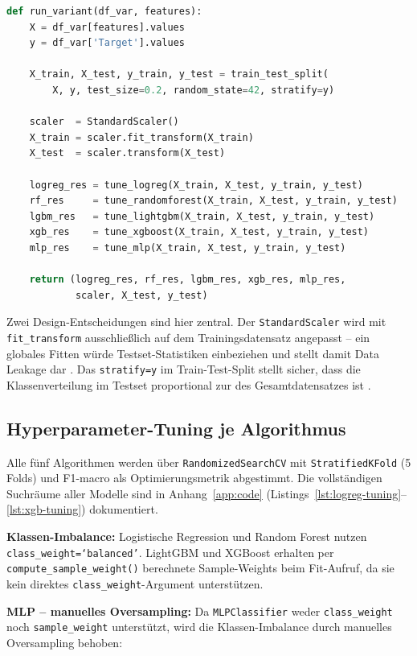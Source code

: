 \begin{lstlisting}[language=Python, caption={\texttt{run\_variant()}: gemeinsamer Trainings-Wrapper},
                   label={lst:run-variant}]
def run_variant(df_var, features):
    X = df_var[features].values
    y = df_var['Target'].values

    X_train, X_test, y_train, y_test = train_test_split(
        X, y, test_size=0.2, random_state=42, stratify=y)

    scaler  = StandardScaler()
    X_train = scaler.fit_transform(X_train)
    X_test  = scaler.transform(X_test)

    logreg_res = tune_logreg(X_train, X_test, y_train, y_test)
    rf_res     = tune_randomforest(X_train, X_test, y_train, y_test)
    lgbm_res   = tune_lightgbm(X_train, X_test, y_train, y_test)
    xgb_res    = tune_xgboost(X_train, X_test, y_train, y_test)
    mlp_res    = tune_mlp(X_train, X_test, y_train, y_test)

    return (logreg_res, rf_res, lgbm_res, xgb_res, mlp_res,
            scaler, X_test, y_test)
\end{lstlisting}

Zwei Design-Entscheidungen sind hier zentral. Der \texttt{StandardScaler}
wird mit \texttt{fit\_transform} ausschließlich auf dem Trainingsdatensatz
angepasst -- ein globales Fitten würde Testset-Statistiken einbeziehen
und stellt damit Data Leakage dar \cite{HastieEtAl2009}. Das
\texttt{stratify=y} im Train-Test-Split stellt sicher, dass die
Klassenverteilung im Testset proportional zur des Gesamtdatensatzes ist
\cite{JamesEtAl2021}.

\subsection{Hyperparameter-Tuning je Algorithmus}

Alle fünf Algorithmen werden über \texttt{RandomizedSearchCV} mit
\texttt{StratifiedKFold} (5 Folds) und F1-macro als Optimierungsmetrik
abgestimmt. Die vollständigen Suchräume aller Modelle sind in
Anhang~\ref{app:code} (Listings~\ref{lst:logreg-tuning}--\ref{lst:xgb-tuning})
dokumentiert.

\textbf{Klassen-Imbalance:} Logistische Regression und Random Forest
nutzen \texttt{class\_weight=`balanced'}. LightGBM und XGBoost erhalten
per \texttt{compute\_sample\_weight()} berechnete Sample-Weights beim
Fit-Aufruf, da sie kein direktes \texttt{class\_weight}-Argument
unterstützen.

\textbf{MLP -- manuelles Oversampling:} Da \texttt{MLPClassifier}
weder \texttt{class\_weight} noch \texttt{sample\_weight} unterstützt,
wird die Klassen-Imbalance durch manuelles Oversampling behoben:

